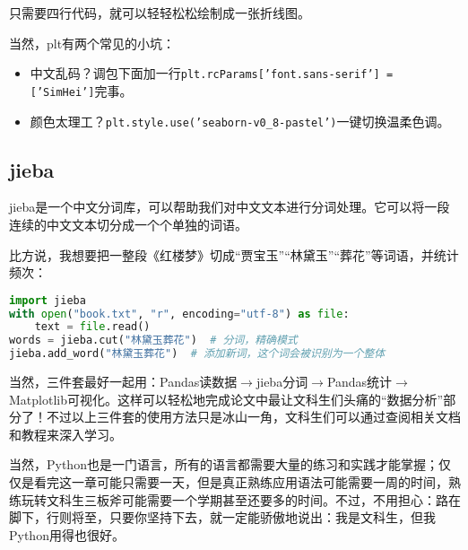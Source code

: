 \documentclass[../main.tex]{subfiles}
\begin{document}
只需要四行代码，就可以轻轻松松绘制成一张折线图。

当然，plt有两个常见的小坑：
\begin{itemize}
  \item 中文乱码？调包下面加一行\texttt{plt.rcParams['font.sans-serif'] = ['SimHei']}完事。
  \item 颜色太理工？\texttt{plt.style.use('seaborn-v0\_8-pastel')}一键切换温柔色调。
\end{itemize}

\subsection{jieba}
jieba是一个中文分词库，可以帮助我们对中文文本进行分词处理。它可以将一段连续的中文文本切分成一个个单独的词语。

比方说，我想要把一整段《红楼梦》切成“贾宝玉”“林黛玉”“葬花”等词语，并统计频次：
\begin{lstlisting}[language=python]
import jieba
with open("book.txt", "r", encoding="utf-8") as file:
    text = file.read()
words = jieba.cut("林黛玉葬花")  # 分词，精确模式
jieba.add_word("林黛玉葬花")  # 添加新词，这个词会被识别为一个整体
\end{lstlisting}

当然，三件套最好一起用：Pandas读数据$\rightarrow$jieba分词$ \rightarrow $Pandas统计$
\rightarrow
$Matplotlib可视化。这样可以轻松地完成论文中最让文科生们头痛的“数据分析”部分了！不过以上三件套的使用方法只是冰山一角，文科生们可以通过查阅相关文档和教程来深入学习。

当然，Python也是一门语言，所有的语言都需要大量的练习和实践才能掌握；仅仅是看完这一章可能只需要一天，但是真正熟练应用语法可能需要一周的时间，熟练玩转文科生三板斧可能需要一个学期甚至还要多的时间。不过，不用担心：路在脚下，行则将至，只要你坚持下去，就一定能骄傲地说出：我是文科生，但我Python用得也很好。
\end{document}
